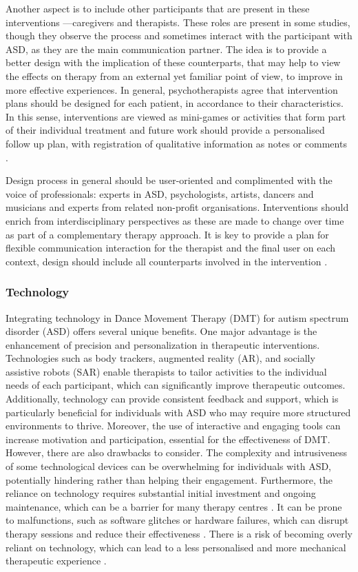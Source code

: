 \documentclass[a4paper,fleqn]{cas-sc}
\begin{document}
Another aspect is to include other participants that are present in these interventions —caregivers and therapists. These roles are present in some studies, though they observe the process and sometimes interact with the participant with ASD, as they are the main communication partner. The idea is to provide a better design with the implication of these counterparts, that may help to view the effects on therapy from an external yet familiar point of view, to improve in more effective experiences. In general, psychotherapists agree that intervention plans should be designed for each patient, in accordance to their characteristics. In this sense, interventions are viewed as mini-games or activities that form part of their individual treatment and future work should provide a personalised follow up plan, with registration of qualitative information as notes or comments  \cite{Raygoza-Romero21}.

Design process in general should be user-oriented and complimented with the voice of professionals: experts in ASD, psychologists, artists, dancers and musicians and experts from related non-profit organisations. Interventions should enrich from interdisciplinary perspectives as these are made to change over time as part of a complementary therapy approach. It is key to provide a plan for flexible communication interaction for the therapist and the final user on each context, design should include all counterparts involved in the intervention \cite{Castelhano17}. 

\subsubsection{Technology}

Integrating technology in Dance Movement Therapy (DMT) for autism spectrum disorder (ASD) offers several unique benefits. One major advantage is the enhancement of precision and personalization in therapeutic interventions. Technologies such as body trackers, augmented reality (AR), and socially assistive robots (SAR) enable therapists to tailor activities to the individual needs of each participant, which can significantly improve therapeutic outcomes. Additionally, technology can provide consistent feedback and support, which is particularly beneficial for individuals with ASD who may require more structured environments to thrive. Moreover, the use of interactive and engaging tools can increase motivation and participation, essential for the effectiveness of DMT. However, there are also drawbacks to consider. The complexity and intrusiveness of some technological devices can be overwhelming for individuals with ASD, potentially hindering rather than helping their engagement. Furthermore, the reliance on technology requires substantial initial investment and ongoing maintenance, which can be a barrier for many therapy centres \cite{Berenguer2020, Kouroupa2022}. It can be prone to malfunctions, such as software glitches or hardware failures, which can disrupt therapy sessions and reduce their effectiveness \cite{Boucenna2014}. There is a risk of becoming overly reliant on technology, which can lead to a less personalised and more mechanical therapeutic experience \cite{Maskey2014}.
\end{document}
